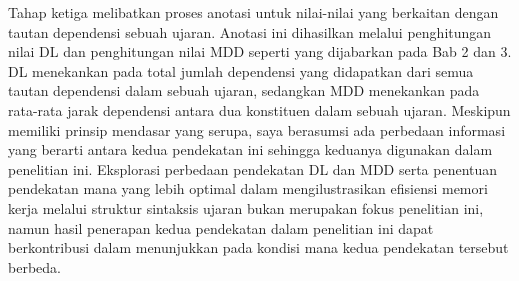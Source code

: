 Tahap ketiga melibatkan proses anotasi untuk nilai-nilai yang berkaitan dengan tautan dependensi sebuah ujaran. Anotasi ini dihasilkan melalui penghitungan nilai DL dan penghitungan nilai MDD seperti yang dijabarkan pada Bab 2 dan 3. DL menekankan pada total jumlah dependensi yang didapatkan dari semua tautan dependensi dalam sebuah ujaran, sedangkan MDD menekankan pada rata-rata jarak dependensi antara dua konstituen dalam sebuah ujaran. Meskipun memiliki prinsip mendasar yang serupa, saya berasumsi ada perbedaan informasi yang berarti antara kedua pendekatan ini sehingga keduanya digunakan dalam penelitian ini. Eksplorasi perbedaan pendekatan DL dan MDD serta penentuan pendekatan mana yang lebih optimal dalam mengilustrasikan efisiensi memori kerja melalui struktur sintaksis ujaran bukan merupakan fokus penelitian ini, namun hasil penerapan kedua pendekatan dalam penelitian ini dapat berkontribusi dalam menunjukkan pada kondisi mana kedua pendekatan tersebut berbeda.

